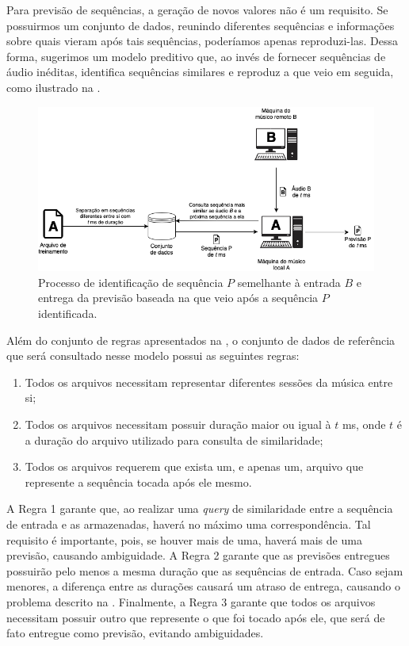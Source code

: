 Para previsão de sequências, a geração de novos valores não é um requisito. Se possuirmos um conjunto de dados, reunindo diferentes sequências e informações sobre quais vieram após tais sequências, poderíamos apenas reproduzi-las. Dessa forma, sugerimos um modelo preditivo que, ao invés de fornecer sequências de áudio inéditas, identifica sequências similares e reproduz a que veio em seguida, como ilustrado na .

\begin{figure}[htbp]
    \centering
    \includegraphics[width=1\textwidth]{images/index-model.png}
    \caption{Processo de identificação de sequência $P$ semelhante à entrada $B$ e entrega da previsão baseada na que veio após a sequência $P$ identificada.}
    \label{fig:indexative_model}
\end{figure}

Além do conjunto de regras apresentados na , o conjunto de dados de referência que será consultado nesse modelo possui as seguintes regras:

\begin{enumerate}
    \item Todos os arquivos necessitam representar diferentes sessões da música entre si;
    \item Todos os arquivos necessitam possuir duração maior ou igual à $t$ ms, onde $t$ é a duração do arquivo utilizado para consulta de similaridade;
    \item Todos os arquivos requerem que exista um, e apenas um, arquivo que represente a sequência tocada após ele mesmo.
\end{enumerate}

A Regra 1 garante que, ao realizar uma \textit{query} de similaridade entre a sequência de entrada e as armazenadas, haverá no máximo uma correspondência. Tal requisito é importante, pois, se houver mais de uma, haverá mais de uma previsão, causando ambiguidade. A Regra 2 garante que as previsões entregues possuirão pelo menos a mesma duração que as sequências de entrada. Caso sejam menores, a diferença entre as durações causará um atraso de entrega, causando o problema descrito na . Finalmente, a Regra 3 garante que todos os arquivos necessitam possuir outro que represente o que foi tocado após ele, que será de fato entregue como previsão, evitando ambiguidades.

